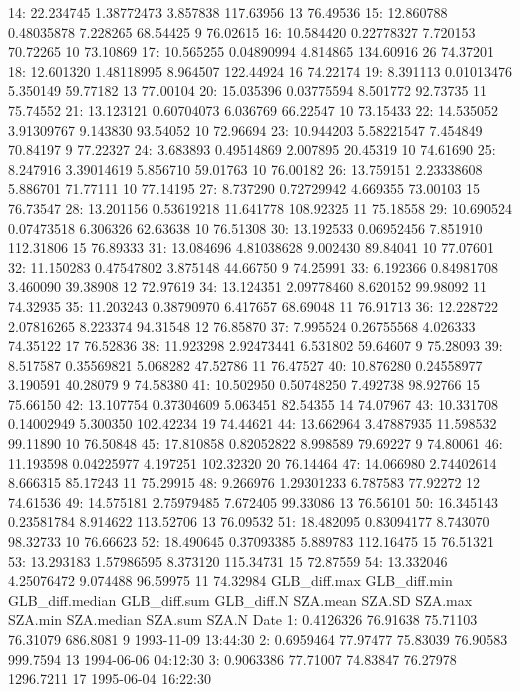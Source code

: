 \documentclass[
  10pt,
  a4paper,oneside]{article}
\begin{document}
14: 22.234745 1.38772473 3.857838 117.63956 13 76.49536
15: 12.860788 0.48035878 7.228265 68.54425 9 76.02615
16: 10.584420 0.22778327 7.720153 70.72265 10 73.10869
17: 10.565255 0.04890994 4.814865 134.60916 26 74.37201
18: 12.601320 1.48118995 8.964507 122.44924 16 74.22174
19: 8.391113 0.01013476 5.350149 59.77182 13 77.00104
20: 15.035396 0.03775594 8.501772 92.73735 11 75.74552
21: 13.123121 0.60704073 6.036769 66.22547 10 73.15433
22: 14.535052 3.91309767 9.143830 93.54052 10 72.96694
23: 10.944203 5.58221547 7.454849 70.84197 9 77.22327
24: 3.683893 0.49514869 2.007895 20.45319 10 74.61690
25: 8.247916 3.39014619 5.856710 59.01763 10 76.00182
26: 13.759151 2.23338608 5.886701 71.77111 10 77.14195
27: 8.737290 0.72729942 4.669355 73.00103 15 76.73547
28: 13.201156 0.53619218 11.641778 108.92325 11 75.18558
29: 10.690524 0.07473518 6.306326 62.63638 10 76.51308
30: 13.192533 0.06952456 7.851910 112.31806 15 76.89333
31: 13.084696 4.81038628 9.002430 89.84041 10 77.07601
32: 11.150283 0.47547802 3.875148 44.66750 9 74.25991
33: 6.192366 0.84981708 3.460090 39.38908 12 72.97619
34: 13.124351 2.09778460 8.620152 99.98092 11 74.32935
35: 11.203243 0.38790970 6.417657 68.69048 11 76.91713
36: 12.228722 2.07816265 8.223374 94.31548 12 76.85870
37: 7.995524 0.26755568 4.026333 74.35122 17 76.52836
38: 11.923298 2.92473441 6.531802 59.64607 9 75.28093
39: 8.517587 0.35569821 5.068282 47.52786 11 76.47527
40: 10.876280 0.24558977 3.190591 40.28079 9 74.58380
41: 10.502950 0.50748250 7.492738 98.92766 15 75.66150
42: 13.107754 0.37304609 5.063451 82.54355 14 74.07967
43: 10.331708 0.14002949 5.300350 102.42234 19 74.44621
44: 13.662964 3.47887935 11.598532 99.11890 10 76.50848
45: 17.810858 0.82052822 8.998589 79.69227 9 74.80061
46: 11.193598 0.04225977 4.197251 102.32320 20 76.14464
47: 14.066980 2.74402614 8.666315 85.17243 11 75.29915
48: 9.266976 1.29301233 6.787583 77.92272 12 74.61536
49: 14.575181 2.75979485 7.672405 99.33086 13 76.56101
50: 16.345143 0.23581784 8.914622 113.52706 13 76.09532
51: 18.482095 0.83094177 8.743070 98.32733 10 76.66623
52: 18.490645 0.37093385 5.889783 112.16475 15 76.51321
53: 13.293183 1.57986595 8.373120 115.34731 15 72.87559
54: 13.332046 4.25076472 9.074488 96.59975 11 74.32984
GLB\_diff.max GLB\_diff.min GLB\_diff.median GLB\_diff.sum GLB\_diff.N SZA.mean
SZA.SD SZA.max SZA.min SZA.median SZA.sum SZA.N Date
1: 0.4126326 76.91638 75.71103 76.31079 686.8081 9 1993-11-09 13:44:30
2: 0.6959464 77.97477 75.83039 76.90583 999.7594 13 1994-06-06 04:12:30
3: 0.9063386 77.71007 74.83847 76.27978 1296.7211 17 1995-06-04 16:22:30
\end{document}
